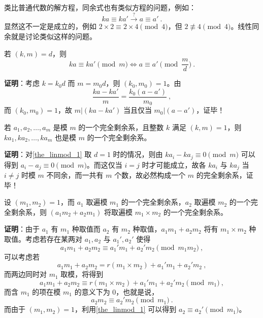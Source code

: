 

类比普通代数的解方程，同余式也有类似方程的问题，例如：
\begin{equation}
ka \equiv ka' \xrightarrow{?} a \equiv a'  ~.
\end{equation}
显然这不一定是成立的，例如 $2 \times 2 \equiv 2 \times 4 \pmod 4$，但 $2 \not \equiv 4 \pmod 4$。线性同余就是讨论类似这样的问题。

\begin{theorem}{}\label{the_linmod_1}
若 $(k, m) = d$，则
\begin{equation}
ka \equiv ka' \pmod m \Leftrightarrow a \equiv a' \pmod{\frac{m}{d}} ~.
\end{equation}
\end{theorem}
\textbf{证明}：考虑 $k = k_0 d$ 而 $m = m_0 d$，则 $(k_0, m_0) = 1$。由
\begin{equation}
\frac{ka - ka'}{m} = \frac{k_0(a - a')}{m_0} ~,
\end{equation}
而 $(k_0, m_0) = 1$，故 $m | (k a - k a')$ 当且仅当 $m_0 | (a - a')$，证毕！

\begin{theorem}{}\label{the_linmod_2}
若 $a_1, a_2, \dots, a_m$ 是模 $m$ 的一个完全剩余系，且整数 $k$ 满足 $(k, m) =1$，则 $ka_1, ka_2, \dots, ka_m$ 也是模 $m$ 的一个完全剩余系。
\end{theorem}
\textbf{证明}：对\autoref{the_linmod_1} 取 $d=1$ 时的情况，则由 $ka_i - ka_j \equiv 0 \pmod m$ 可以得到 $a_i - a_j \equiv 0 \pmod m$。而这仅当 $i = j$ 时才可能成立，故各 $ka_i$ 与 $ka_j$ 当 $i \neq j$ 时模 $m$ 不同余，而一共有 $m$ 个数，故必然构成一个 $m$ 的完全剩余系，证毕！

\begin{theorem}{}\label{the_linmod_3}
设 $(m_1, m_2) = 1$，而 $a_1$ 取遍模 $m_1$ 的一个完全剩余系，$a_2$ 取遍模 $m_2$ 的一个完全剩余系，则 $(a_1 m_2 + a_2 m_1)$ 将取遍模 $m_1 \times m_2$ 的一个完全剩余系。
\end{theorem}
\textbf{证明}：由于 $a_1$ 有 $m_1$ 种取值而 $a_2$ 有 $m_2$ 种取值，$a_1m_1+a_2m_2$ 将有 $m_1 \times m_2$ 种取值。考虑若存在某两对 $a_1, a_2$ 与 $a_1', a_2'$ 使得
\begin{equation}
a_1 m_1 + a_2 m_2 \equiv a_1' m_1 + a_2' m_2 \pmod{m_1 m_2} ~,
\end{equation}
可以考虑若
\begin{equation}
a_1 m_1 + a_2 m_2= r(m_1 \times m_2) + a_1' m_1 + a_2' m_2 ~,
\end{equation}
而两边同时对 $m_1$ 取模，将得到
\begin{equation}
a_1 m_1 + a_2 m_2 \equiv r(m_1 \times m_2) + a_1' m_1 + a_2' m_2  \pmod{m_1} ~,
\end{equation}
而含 $m_1$ 的项在模 $m_1$ 的意义下为 $0$，也就是说，
\begin{equation}
a_2 m_2 \equiv a_2' m_2 \pmod{m_1} ~.
\end{equation}
而由于 $(m_1, m_2) = 1$，利用\autoref{the_linmod_1} 可以得到 $a_2 \equiv a_2' \pmod{m_1}$。

